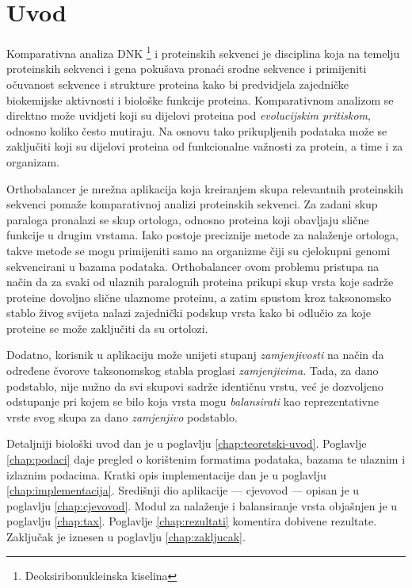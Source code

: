 \chapter{Uvod}
\label{chap:uvod}

Komparativna analiza DNK \footnote{Deoksiribonukleinska kiselina} i proteinskih
sekvenci je disciplina koja na temelju proteinskih sekvenci i gena pokušava
pronaći srodne sekvence i primijeniti očuvanost sekvence i strukture proteina
kako bi predvidjela zajedničke biokemijske aktivnosti i biološke funkcije
proteina. \cite{koonin} Komparativnom analizom se direktno može uvidjeti koji su
dijelovi proteina pod \emph{evolucijskim pritiskom}, odnosno koliko često
mutiraju. Na osnovu tako prikupljenih podataka može se zaključiti koji su
dijelovi proteina od funkcionalne važnosti za protein, a time i za organizam.

Orthobalancer je mrežna aplikacija koja kreiranjem skupa relevantnih proteinskih
sekvenci pomaže komparativnoj analizi proteinskih sekvenci. Za zadani skup
paraloga pronalazi se skup ortologa, odnosno proteina koji obavljaju slične
funkcije u drugim vrstama. Iako postoje preciznije metode za nalaženje ortologa,
takve metode se mogu primijeniti samo na organizme čiji su cjelokupni genomi
sekvencirani u bazama podataka.  Orthobalancer ovom problemu pristupa na način
da za svaki od ulaznih paralognih proteina prikupi skup vrsta koje sadrže
proteine dovoljno slične ulaznome proteinu, a zatim spustom kroz taksonomsko
stablo živog svijeta nalazi zajednički podskup vrsta kako bi odlučio za koje
proteine se može zaključiti da su ortolozi.

Dodatno, korisnik u aplikaciju može unijeti stupanj \emph{zamjenjivosti} na
način da određene čvorove taksonomskog stabla proglasi \emph{zamjenjivima}.
Tada, za dano podstablo, nije nužno da svi skupovi sadrže identičnu vrstu, već
je dozvoljeno odstupanje pri kojem se bilo koja vrsta mogu \emph{balansirati}
kao reprezentativne vrste svog skupa za dano \emph{zamjenjivo} podstablo.

Detaljniji biološki uvod dan je u poglavlju \ref{chap:teoretski-uvod}. Poglavlje
\ref{chap:podaci} daje pregled o korištenim formatima podataka, bazama te
ulaznim i izlaznim podacima. Kratki opis implementacije dan je u poglavlju
\ref{chap:implementacija}. Središnji dio aplikacije --- cjevovod --- opisan je u
poglavlju \ref{chap:cjevovod}. Modul za nalaženje i balansiranje vrsta objašnjen
je u poglavlju \ref{chap:tax}. Poglavlje \ref{chap:rezultati} komentira dobivene
rezultate. Zaključak je iznesen u poglavlju \ref{chap:zakljucak}.


 
